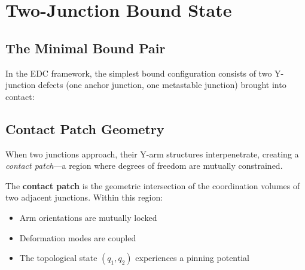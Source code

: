 \section{Two-Junction Bound State}
\label{sec:d:physical}

\subsection{The Minimal Bound Pair}

In the EDC framework, the simplest bound configuration consists of two
Y-junction defects (one anchor junction, one metastable junction) brought
into contact:

\begin{center}
\end{center}

\subsection{Contact Patch Geometry}

When two junctions approach, their Y-arm structures interpenetrate,
creating a \emph{contact patch}---a region where degrees of freedom are
mutually constrained.

\begin{definition}
    The \textbf{contact patch} is the geometric intersection of the
    coordination volumes of two adjacent junctions. Within this region:
    \begin{itemize}
        \item Arm orientations are mutually locked
        \item Deformation modes are coupled
        \item The topological state $(q_1, q_2)$ experiences a pinning potential
    \end{itemize}
    \tagDc
\end{definition}

